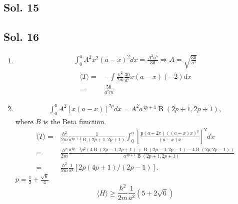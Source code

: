 \subsection*{Sol. 15}

\subsection*{Sol. 16}
\begin{enumerate}
    \item \begin{align*}
    \int_0^a A^2x^2(a-x)^2dx=\frac{A^2a^5}{30}\Rightarrow A = \sqrt{\frac{30}{a^5}}
\end{align*}
\begin{align*}
    \langle T\rangle =& 
    -\int \frac{\hbar^2}{2m}
    \frac{30}{a^5}
    x(a-x)(-2)dx\\
    =&\frac{5\hbar}{a^2m}
\end{align*}
\item 
\begin{align*}
    \int_0^a A^2[x(a-x)]^{2p}dx=
    A^{2} a^{4p + 1} \operatorname{B}\left(2p + 1,2p + 1\right),
\end{align*}
where $B$ is the Beta function.
\begin{align*}
    \langle T\rangle
    =&\frac{\hbar^2}{2m}
    \frac{1}{a^{4p + 1} \operatorname{B}\left(2p + 1,2p + 1\right)}
    \int_0^a
    \left[\frac{p \left(a - 2x\right) \left(\left(a - x\right) x\right)^{p}}{\left(a - x\right) x}\right]^2dx\\
    =&
    \frac{\hbar^2}{2m}
    \frac{a^{4p - 1} p^{2} \left(4 \operatorname{B}\left(2p - 1,2p + 1\right) + \operatorname{B}\left(2p - 1,2p - 1\right) - 4 \operatorname{B}\left(2p,2p - 1\right)\right)}{a^{4p + 1} \operatorname{B}\left(2p + 1,2p + 1\right)}\\
    =&\frac{\hbar^2}{2m}
    \frac{1}{a^2}[
    2p(4p + 1)/(2p - 1)
    ].
\end{align*}
$p=\frac{1}{2}+\frac{\sqrt{6}}{4}$
$$
\langle H\rangle\geq 
\frac{\hbar^2}{2m}\frac{1}{a^2}(5+2\sqrt{6})
$$
\end{enumerate}


